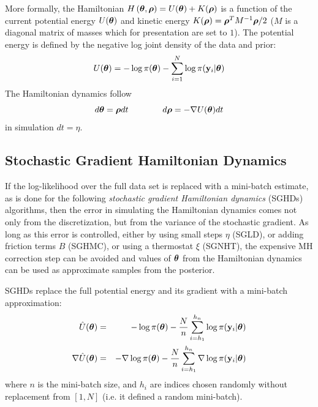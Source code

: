 \documentclass[]{article}
\begin{document}
More formally, the Hamiltonian $H\left({\bm \theta}, {\bm \rho} \right) = U({\bm \theta}) + K({\bm \rho})$ is a function of the current potential energy $U({\bm \theta})$ and kinetic energy $K({\bm \rho}) = {\bm \rho}^T M^{-1}{\bm \rho}/2$ ($M$ is a diagonal matrix of masses which for presentation are set to $1$).  The potential energy is defined by the negative log joint density of the data and prior:
\begin{equation}
  U({\bm \theta}) = - \log \pi({\bm \theta}) - \sum_{i=1}^N \log \pi({\bf y}_i | {\bm \theta} )
\end{equation}
The Hamiltonian dynamics follow 
\begin{equation}
  d{\bm \theta} = {\bm \rho} dt ~~~~~~~~~~~~ d{\bm \rho} = -\nabla U({\bm \theta}) dt
\end{equation}
in simulation $dt = \eta$. 

\subsection{Stochastic Gradient Hamiltonian Dynamics}\label{se:sghd}
If the log-likelihood over the full data set is replaced with a mini-batch estimate, as is done for the following {\em stochastic gradient Hamiltonian dynamics} (SGHDs) algorithms, then the error in simulating the Hamiltonian dynamics comes not only from the discretization, but from the variance of the stochastic gradient.  As long as this error is controlled, either by using small steps $\eta$ (SGLD), or adding friction terms $B$ (SGHMC), or using a thermostat $\xi$ (SGNHT), the expensive MH correction step can be avoided and values of ${\bm \theta}$ from the Hamiltonian dynamics can be used as approximate samples from the posterior.

SGHDs replace the full potential energy and its gradient with a mini-batch approximation:
\begin{eqnarray}
  \hat{U}({\bm \theta})       & = & - \log \pi({\bm \theta}) - \frac{N}{n} \sum_{i=h_1}^{h_n} \log \pi({\bf y}_i | {\bm \theta} ) \\
  \nabla\hat{U}({\bm \theta}) & = & - \nabla \log \pi({\bm \theta}) - \frac{N}{n} \sum_{i=h_1}^{h_n} \nabla \log \pi({\bf y}_i | {\bm \theta} ) 
\end{eqnarray} 
where $n$ is the mini-batch size, and $h_i$ are indices chosen randomly without replacement from $[1,N]$ (i.e. it defined a random mini-batch).  
 
\end{document}
